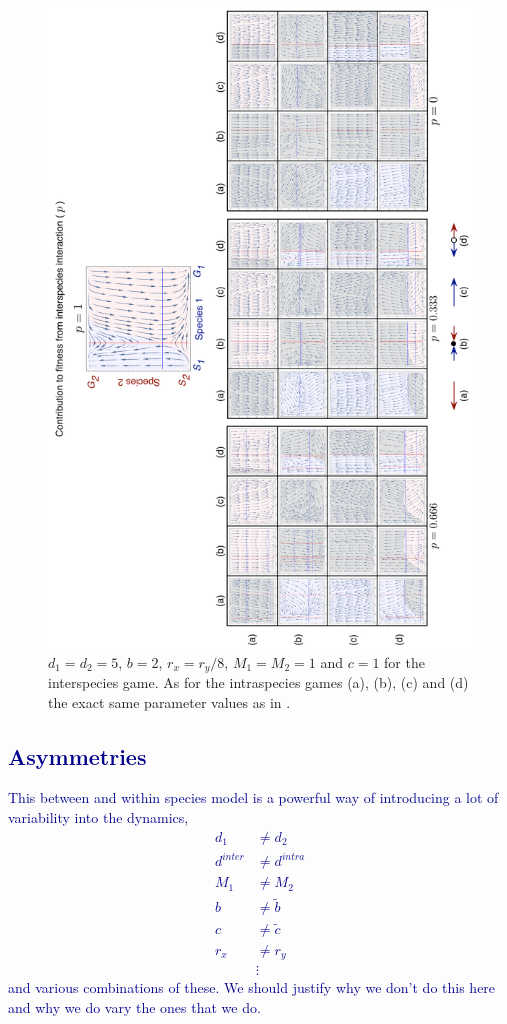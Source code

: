 \documentclass{pnastwo}
\newcommand{\cha}[1]{\textcolor{darkblue}{#1}}
\begin{document}
\begin{article}
\begin{figure}[h]
\begin{center}
\includegraphics[width=1.5\columnwidth]{../Figures/Dynamicsacrossp_reduced.pdf}
\caption{
$d_1 = d_2 = 5$, $b= 2$, $r_x = r_y/8$, $M_1 = M_2 = 1$ and $c=1$ for the interspecies game. As for the intraspecies games (a), (b), (c) and (d) the exact same parameter values as in \cite{hauert:JTB:2006a}.
}
\end{center}
\end{figure}


\cha{\section{Asymmetries}}

\cha{This between and within species model is a powerful way of introducing a lot of variability into the dynamics,
\begin{align}
	d_1 &\neq d_2 \\
	d^{inter} &\neq d^{intra} \\
	M_1 &\neq M_2 \\
	b &\neq \tilde{b} \\
	c &\neq \tilde{c} \\
	r_x &\neq r_y \\
	&\vdots
\end{align}
and various combinations of these. We should justify why we don't do this here and why we do vary the ones that we do.}



\end{article}
\end{document}

